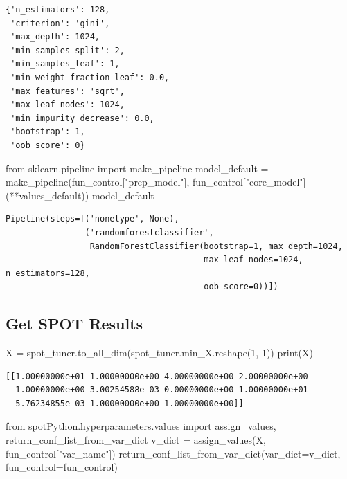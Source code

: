 \documentclass[
  letterpaper,
  DIV=11,
  numbers=noendperiod]{scrreprt}
\newenvironment{Shaded}{\begin{snugshade}}{\end{snugshade}}
\newcommand{\BuiltInTok}[1]{\textcolor[rgb]{0.00,0.23,0.31}{#1}}
\newcommand{\DecValTok}[1]{\textcolor[rgb]{0.68,0.00,0.00}{#1}}
\newcommand{\ImportTok}[1]{\textcolor[rgb]{0.00,0.46,0.62}{#1}}
\newcommand{\NormalTok}[1]{\textcolor[rgb]{0.00,0.23,0.31}{#1}}
\newcommand{\OperatorTok}[1]{\textcolor[rgb]{0.37,0.37,0.37}{#1}}
\newcommand{\StringTok}[1]{\textcolor[rgb]{0.13,0.47,0.30}{#1}}
\begin{document}
\begin{verbatim}
{'n_estimators': 128,
 'criterion': 'gini',
 'max_depth': 1024,
 'min_samples_split': 2,
 'min_samples_leaf': 1,
 'min_weight_fraction_leaf': 0.0,
 'max_features': 'sqrt',
 'max_leaf_nodes': 1024,
 'min_impurity_decrease': 0.0,
 'bootstrap': 1,
 'oob_score': 0}
\end{verbatim}

\begin{Shaded}
\begin{Highlighting}[]
\ImportTok{from}\NormalTok{ sklearn.pipeline }\ImportTok{import}\NormalTok{ make\_pipeline}
\NormalTok{model\_default }\OperatorTok{=}\NormalTok{ make\_pipeline(fun\_control[}\StringTok{"prep\_model"}\NormalTok{], fun\_control[}\StringTok{"core\_model"}\NormalTok{](}\OperatorTok{**}\NormalTok{values\_default))}
\NormalTok{model\_default}
\end{Highlighting}
\end{Shaded}

\begin{verbatim}
Pipeline(steps=[('nonetype', None),
                ('randomforestclassifier',
                 RandomForestClassifier(bootstrap=1, max_depth=1024,
                                        max_leaf_nodes=1024, n_estimators=128,
                                        oob_score=0))])
\end{verbatim}

\hypertarget{get-spot-results-2}{%
\subsection{Get SPOT Results}\label{get-spot-results-2}}

\begin{Shaded}
\begin{Highlighting}[]
\NormalTok{X }\OperatorTok{=}\NormalTok{ spot\_tuner.to\_all\_dim(spot\_tuner.min\_X.reshape(}\DecValTok{1}\NormalTok{,}\OperatorTok{{-}}\DecValTok{1}\NormalTok{))}
\BuiltInTok{print}\NormalTok{(X)}
\end{Highlighting}
\end{Shaded}

\begin{verbatim}
[[1.00000000e+01 1.00000000e+00 4.00000000e+00 2.00000000e+00
  1.00000000e+00 3.00254588e-03 0.00000000e+00 1.00000000e+01
  5.76234855e-03 1.00000000e+00 1.00000000e+00]]
\end{verbatim}

\begin{Shaded}
\begin{Highlighting}[]
\ImportTok{from}\NormalTok{ spotPython.hyperparameters.values }\ImportTok{import}\NormalTok{ assign\_values, return\_conf\_list\_from\_var\_dict}
\NormalTok{v\_dict }\OperatorTok{=}\NormalTok{ assign\_values(X, fun\_control[}\StringTok{"var\_name"}\NormalTok{])}
\NormalTok{return\_conf\_list\_from\_var\_dict(var\_dict}\OperatorTok{=}\NormalTok{v\_dict, fun\_control}\OperatorTok{=}\NormalTok{fun\_control)}
\end{Highlighting}
\end{Shaded}
\end{document}
